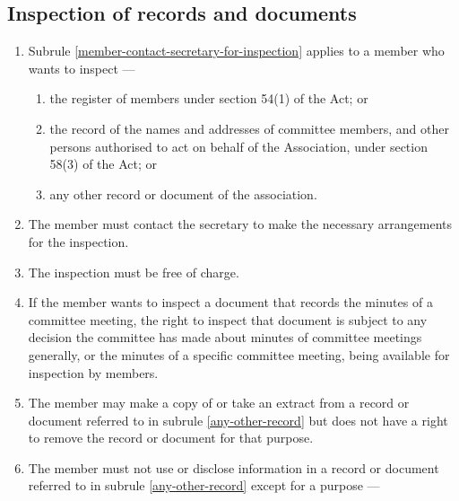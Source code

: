 \documentclass[../constitution.tex]{subfiles}
\begin{document}
\hypertarget{inspection-of-records-and-documents}{%
  \subsection{Inspection of records and documents}\label{inspection-of-records-and-documents}}

\begin{enumerate}

  \item Subrule \ref{member-contact-secretary-for-inspection} applies to a member who wants to inspect ---

        \begin{enumerate}

          \item the register of members under section 54(1) of the Act; or
          \item the record of the names and addresses of committee members, and other persons authorised to act on behalf of the Association, under section 58(3) of the Act; or
          \item any other record or document of the association. \label{any-other-record}
        \end{enumerate}
  \item The member must contact the secretary to make the necessary arrangements for the inspection. \label{member-contact-secretary-for-inspection}
  \item The inspection must be free of charge.
  \item If the member wants to inspect a document that records the minutes of a committee meeting, the right to inspect that document is subject to any decision the committee has made about minutes of committee meetings generally, or the minutes of a specific committee meeting, being available for inspection by members.
  \item The member may make a copy of or take an extract from a record or document referred to in subrule \ref{any-other-record} but does not have a right to remove the record or document for that purpose.


  \item The member must not use or disclose information in a record or document referred to in subrule \ref{any-other-record} except for a purpose ---


\end{enumerate}
\end{document}
